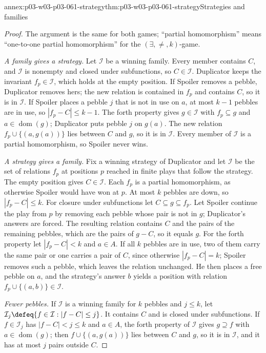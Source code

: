 \begin{annexitem}{annex:p03-w03-p03-061-strategy}{thm:p03-w03-p03-061-strategy}{Strategies and families}
\begin{proof}
The argument is the same for both games; ``partial homomorphism'' means
``one-to-one partial homomorphism'' for the \((\exists,\neq,k)\)-game.

\emph{A family gives a strategy.} Let \(\mathcal I\) be a winning family.
Every member contains \(C\), and \(\mathcal I\) is nonempty and closed under
subfunctions, so \(C\in\mathcal I\). Duplicator keeps the invariant
\(f_p\in\mathcal I\), which holds at the empty position. If Spoiler removes a
pebble, Duplicator removes hers; the new relation is contained in \(f_p\) and
contains \(C\), so it is in \(\mathcal I\). If Spoiler places a pebble \(j\)
that is not in use on \(a\), at most \(k-1\) pebbles are in use, so
\(|f_p-C|\le k-1\). The forth property gives \(g\in\mathcal I\) with
\(f_p\subseteq g\) and \(a\in\operatorname{dom}(g)\); Duplicator puts pebble
\(j\) on \(g(a)\). The new relation \(f_p\cup\{(a,g(a))\}\) lies between
\(C\) and \(g\), so it is in \(\mathcal I\). Every member of \(\mathcal I\) is
a partial homomorphism, so Spoiler never wins.

\emph{A strategy gives a family.} Fix a winning strategy of Duplicator and let
\(\mathcal I\) be the set of relations \(f_p\) at positions \(p\) reached in
finite plays that follow the strategy. The empty position gives
\(C\in\mathcal I\). Each \(f_p\) is a partial homomorphism, as otherwise
Spoiler would have won at \(p\). At most \(k\) pebbles are down, so
\(|f_p-C|\le k\). For closure under subfunctions let \(C\subseteq g\subseteq
f_p\). Let Spoiler continue the play from \(p\) by removing each pebble whose
pair is not in \(g\); Duplicator's answers are forced. The resulting
relation contains \(C\) and the pairs of the remaining pebbles, which are the
pairs of \(g-C\), so it equals \(g\). For the forth property let \(|f_p-C|<k\)
and \(a\in A\). If all \(k\) pebbles are in use, two of them carry the same
pair or one carries a pair of \(C\), since otherwise \(|f_p-C|=k\); Spoiler
removes such a pebble, which leaves the relation unchanged. He then places a
free pebble on \(a\), and the strategy's answer \(b\) yields a position with
relation \(f_p\cup\{(a,b)\}\in\mathcal I\).

\emph{Fewer pebbles.} If \(\mathcal I\) is a winning family for \(k\) pebbles
and \(j\le k\), let \(\mathcal I_j\defeq\{f\in\mathcal I:|f-C|\le j\}\). It
contains \(C\) and is closed under subfunctions. If \(f\in\mathcal I_j\) has
\(|f-C|<j\le k\) and \(a\in A\), the forth property of \(\mathcal I\) gives
\(g\supseteq f\) with \(a\in\operatorname{dom}(g)\); then
\(f\cup\{(a,g(a))\}\) lies between \(C\) and \(g\), so it is in \(\mathcal I\),
and it has at most \(j\) pairs outside \(C\).
\end{proof}
\end{annexitem}

